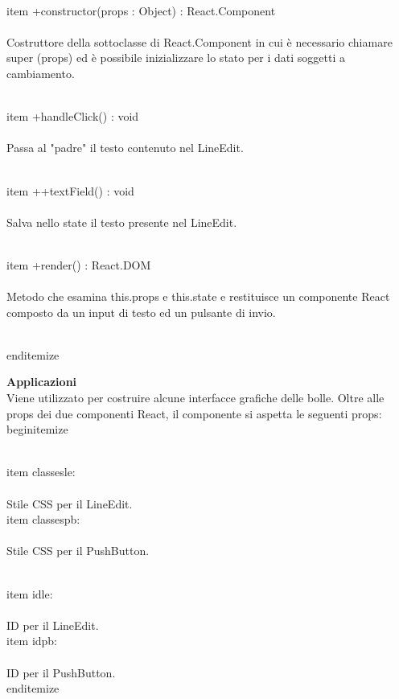 \\item +constructor(props : Object) : React.Component 
\\\\
Costruttore della sottoclasse di React.Component in cui è necessario chiamare super (props) ed è possibile inizializzare lo stato per i dati soggetti a cambiamento.

\\item +handleClick() : void  
\\\\
Passa al "padre" il testo contenuto nel LineEdit.

\\item ++textField() : void  
\\\\
Salva nello state il testo presente nel LineEdit.

\\item +render() : React.DOM 
\\\\
Metodo che esamina this.props e this.state e restituisce un componente React composto da un input di testo ed un pulsante di invio.

\\end{itemize} 


\textbf{Applicazioni}\\
Viene utilizzato per costruire alcune interfacce grafiche delle bolle.
Oltre alle props dei due componenti React, il componente si aspetta le seguenti props:
\\begin{itemize}

\\item classesle:
\\\\
Stile CSS per il LineEdit.
\\item classespb:
\\\\ 
Stile CSS per il PushButton.

\\item idle:
\\\\
ID per il LineEdit.
\\item idpb: 
\\\\
ID per il PushButton.
\\end{itemize} 


\clearpage

